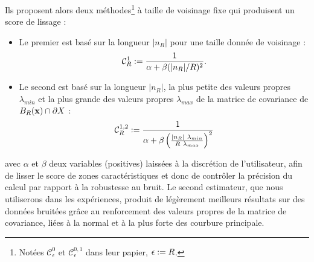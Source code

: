 Ils proposent alors deux méthodes\footnote{Notées $\mathcal{C}_{\epsilon}^{0}$
et $\mathcal{C}_{\epsilon}^{0,1}$ dans leur papier, $\epsilon := R$.} à taille de
voisinage fixe qui produisent un score de lissage :
%
\begin{itemize}
%
  \item Le premier est basé sur la longueur $|n_R|$ pour une taille donnée de
  voisinage :
  \begin{equation}
    \mathcal{C}_{R}^{1} := \frac{1}{\alpha + \beta(|n_R|/R)^2} .
    \label{eq:moment-C0}
  \end{equation}
%
  \item Le second est basé sur la longueur $|n_R|$, la plus petite des valeurs
  propres $\lambda_{min}$ et la plus grande des valeurs propres $\lambda_{max}$
  de la matrice de covariance de $B_{R}(\mathbf{x}) \cap \partial X$ :
  \begin{equation}
    \mathcal{C}_{R}^{1,2} := \frac{1}{\alpha + \beta
    \left( \frac{|n_R|~\lambda_{min}}{R~\lambda_{max}} \right)^2}
    \label{eq:moment-C1}
  \end{equation}
%
\end{itemize}
%
avec $\alpha$ et $\beta$ deux variables (positives) laissées à la discrétion de
l'utilisateur, afin de lisser le score de zones caractéristiques et donc de
contrôler la précision du calcul par rapport à la robustesse au bruit. Le second
estimateur, que nous utiliserons dans les expériences, produit de légèrement
meilleurs résultats sur des données bruitées grâce au renforcement des valeurs
propres de la matrice de covariance, liées à la normal et à la plus forte des
courbure principale.
%
%
